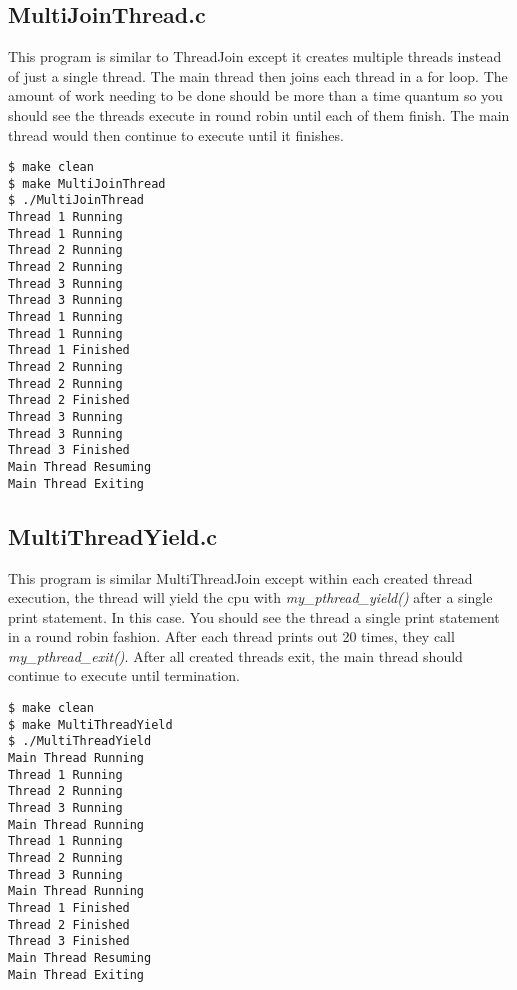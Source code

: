 \documentclass{article}
\begin{document}
\subsection{MultiJoinThread.c}
This program is similar to ThreadJoin except it creates multiple threads instead of just a single thread. The main thread then joins each thread in a for loop. The amount of work needing to be done should be more than a time quantum so you should see the threads execute in round robin until each of them finish. The main thread would then continue to execute until it finishes.
\begin{commandline}
	\begin{verbatim}
$ make clean
$ make MultiJoinThread 
$ ./MultiJoinThread 
Thread 1 Running 
Thread 1 Running 
Thread 2 Running 
Thread 2 Running 
Thread 3 Running 
Thread 3 Running 
Thread 1 Running 
Thread 1 Running 
Thread 1 Finished 
Thread 2 Running 
Thread 2 Running 
Thread 2 Finished 
Thread 3 Running 
Thread 3 Running 
Thread 3 Finished
Main Thread Resuming 
Main Thread Exiting
	\end{verbatim}
\end{commandline}


\subsection{MultiThreadYield.c}
This program is similar MultiThreadJoin except within each created thread execution, the thread will yield the cpu with \textit{my\_pthread\_yield()} after a single print statement. In this case. You should see the thread a single print statement in a round robin fashion. After each thread prints out 20 times, they call \textit{my\_pthread\_exit()}. After all created threads exit, the main thread should continue to execute until termination.
\begin{commandline}
	\begin{verbatim}
$ make clean
$ make MultiThreadYield 
$ ./MultiThreadYield 
Main Thread Running 
Thread 1 Running
Thread 2 Running
Thread 3 Running
Main Thread Running 
Thread 1 Running
Thread 2 Running
Thread 3 Running
Main Thread Running 
Thread 1 Finished 
Thread 2 Finished 
Thread 3 Finished
Main Thread Resuming 
Main Thread Exiting
	\end{verbatim}
\end{commandline}

\end{document}
